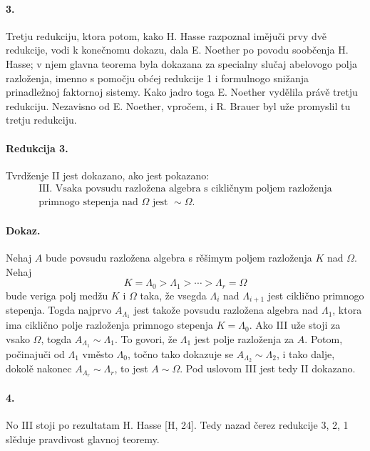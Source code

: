 \documentclass[11pt]{article}
\begin{document}
\paragraph{3.}
Tretju redukciju, ktora potom, kako H. Hasse razpoznal imějuči prvy dvě redukcije, vodi k konečnomu dokazu, dala E. Noether po povodu soobčenja H. Hasse; v njem glavna teorema byla dokazana za specialny slučaj abelovogo polja razloženja, imenno s pomočju obćej redukcije 1 i formulnogo snižanja prinadležnoj faktornoj sistemy. Kako jadro toga E. Noether vydělila právě tretju redukciju. Nezavisno od E. Noether, vpročem, i R. Brauer byl uže promyslil tu tretju redukciju.

\paragraph{Redukcija 3.}
Tvrdženje II jest dokazano, ako jest pokazano:
\[
\begin{gathered}\text{III. Vsaka povsudu razložena algebra s cikličnym poljem razloženja}\\\text{primnogo stepenja nad }\Omega\text{ jest }\sim\Omega .\end{gathered}
\]

\paragraph{Dokaz.}
Nehaj \(A\) bude povsudu razložena algebra s rěšimym poljem razloženja \(K\) nad \(\Omega\). Nehaj
\[
K=\Lambda_0>\Lambda_1>\cdots>\Lambda_r=\Omega
\]
bude veriga polj medžu \(K\) i \(\Omega\) taka, že vsegda \(\Lambda_i\) nad \(\Lambda_{i+1}\) jest ciklično primnogo stepenja. Togda najprvo \(A_{\Lambda_1}\) jest takože povsudu razložena algebra nad \(\Lambda_1\), ktora ima ciklično polje razloženja primnogo stepenja \(K=\Lambda_0\). Ako III uže stoji za vsako \(\Omega\), togda \(A_{\Lambda_1}\sim \Lambda_1\). To govori, že \(\Lambda_1\) jest polje razloženja za \(A\). Potom, počinajuči od \(\Lambda_1\) vměsto \(\Lambda_0\), točno tako dokazuje se \(A_{\Lambda_2}\sim\Lambda_2\), i tako dalje, dokolě nakonec \(A_{\Lambda_r}\sim\Lambda_r\), to jest \(A\sim\Omega\). Pod uslovom III jest tedy II dokazano.

\paragraph{4.}
No III stoji po rezultatam H. Hasse [H, 24]. Tedy nazad čerez redukcije 3, 2, 1 slěduje pravdivost glavnoj teoremy.
\end{document}
